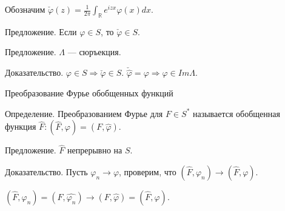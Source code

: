 \documentclass[12pt,titlepage, a4paper]{article}
\begin{document}
Обозначим $\check \varphi(z)=
\frac{1}{2\pi}\int_{\mathbb{R}}e^{izx}\varphi(x)dx$.

Предложение. Если $\varphi\in S$, то $\check\varphi\in S$.

Предложение. $\Lambda$ --- сюръекция.

Доказательство. $\varphi\in S\Rightarrow \check\varphi\in S$.
$\check{\hat\varphi}=\varphi\Rightarrow \varphi\in Im \Lambda$.

\begin{center}
Преобразование Фурье обобщенных функций
\end{center}

Определение. Преобразованием Фурье для $F\in S^*$ называется
обобщенная функция $\hat F : (\hat F,\varphi)=(F,\hat\varphi)$.

Предложение. $\hat F$ непрерывно на $S$.

Доказательство. Пусть $\varphi_n\rightarrow\varphi$, проверим, что
$(\hat F,\varphi_n)\rightarrow (\hat F,\varphi)$.

$(\hat F,\varphi_n)=(F,\widehat{\varphi_n})\rightarrow
(F,\hat\varphi)=(\hat F,\varphi)$.
\end{document}

